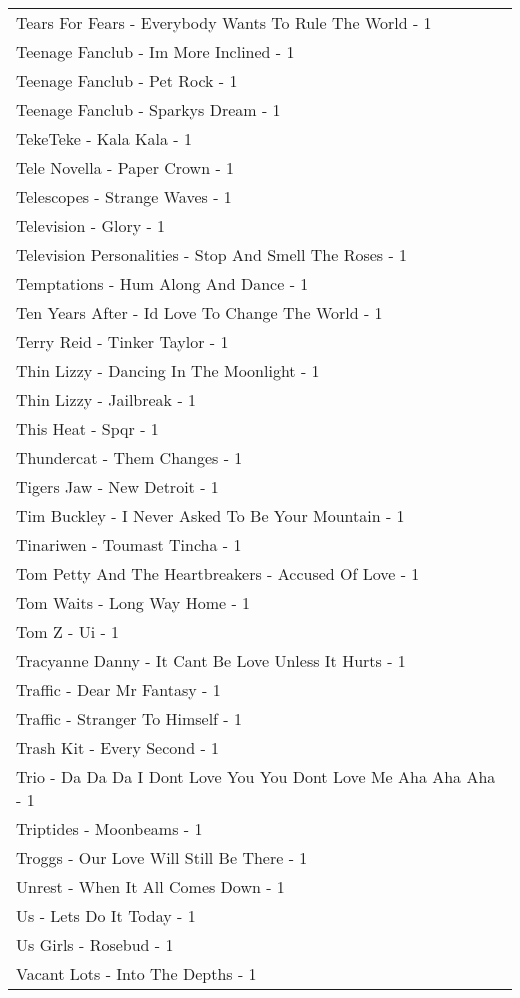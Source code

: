\documentclass[
]{article}
\begin{document}
\begin{longtable}{l}
Tears For Fears - Everybody Wants To Rule The World - 1 \\ 
Teenage Fanclub - Im More Inclined - 1 \\ 
Teenage Fanclub - Pet Rock - 1 \\ 
Teenage Fanclub - Sparkys Dream - 1 \\ 
TekeTeke - Kala Kala - 1 \\ 
Tele Novella - Paper Crown - 1 \\ 
Telescopes - Strange Waves - 1 \\ 
Television - Glory - 1 \\ 
Television Personalities - Stop And Smell The Roses - 1 \\ 
Temptations - Hum Along And Dance - 1 \\ 
Ten Years After - Id Love To Change The World - 1 \\ 
Terry Reid - Tinker Taylor - 1 \\ 
Thin Lizzy - Dancing In The Moonlight - 1 \\ 
Thin Lizzy - Jailbreak - 1 \\ 
This Heat - Spqr - 1 \\ 
Thundercat - Them Changes - 1 \\ 
Tigers Jaw - New Detroit - 1 \\ 
Tim Buckley - I Never Asked To Be Your Mountain - 1 \\ 
Tinariwen - Toumast Tincha - 1 \\ 
Tom Petty And The Heartbreakers - Accused Of Love - 1 \\ 
Tom Waits - Long Way Home - 1 \\ 
Tom Z - Ui - 1 \\ 
Tracyanne Danny - It Cant Be Love Unless It Hurts - 1 \\ 
Traffic - Dear Mr Fantasy - 1 \\ 
Traffic - Stranger To Himself - 1 \\ 
Trash Kit - Every Second - 1 \\ 
Trio - Da Da Da I Dont Love You You Dont Love Me Aha Aha Aha - 1 \\ 
Triptides - Moonbeams - 1 \\ 
Troggs - Our Love Will Still Be There - 1 \\ 
Unrest - When It All Comes Down - 1 \\ 
Us - Lets Do It Today - 1 \\ 
Us Girls - Rosebud - 1 \\ 
Vacant Lots - Into The Depths - 1 \\ 

\end{longtable}
\end{document}
